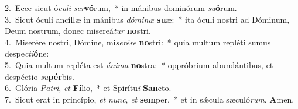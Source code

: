 {2.~}Ecce sicut ó\textit{cu}\textit{li} \textit{ser}\textbf{vó}rum,~* in mánibus dominórum \textit{su}\textbf{ó}rum.\\
{3.~}Sicut óculi ancíllæ in mánibus \textit{dó}\textit{mi}\textit{næ} \textbf{su}æ:~* ita óculi nostri ad Dóminum, Deum nostrum, donec misereá\textit{tur} \textbf{no}stri.\\
{4.~}Miserére nostri, Dómine, mi\textit{se}\textit{ré}\textit{re} \textbf{no}stri:~* quia multum repléti sumus despe\textit{cti}\textbf{ó}ne:\\
{5.~}Quia multum repléta est \textit{á}\textit{ni}\textit{ma} \textbf{no}stra:~* oppróbrium abundántibus, et despéctio \textit{su}\textbf{pér}bis.\\
{6.~}Glória \textit{Pa}\textit{tri}, \textit{et} \textbf{Fí}lio,~* et Spirítu\textit{i} \textbf{San}cto.\\
{7.~}Sicut erat in princípio, \textit{et} \textit{nunc}, \textit{et} \textbf{sem}per,~* et in sǽcula sæculó\textit{rum}. \textbf{A}men.\\
